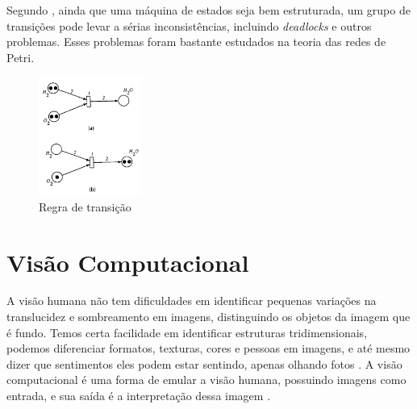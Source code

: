 Segundo , ainda que uma máquina de estados seja bem estruturada, um grupo de transições pode levar a sérias inconsistências, incluindo \textit{deadlocks} e outros problemas. Esses problemas foram bastante estudados na teoria das redes de Petri. 

 \begin{figure}[H]
	\centering
    	\caption{\label{fig:petri}Regra de transição}
		\includegraphics[width = 0.3\textwidth]	{resources/petri}
\end{figure}



\section{Visão Computacional}

A visão humana não tem dificuldades em identificar pequenas variações na translucidez e sombreamento em imagens, distinguindo os objetos da imagem que é fundo. Temos certa facilidade em identificar estruturas tridimensionais, podemos diferenciar formatos, texturas, cores e pessoas em imagens, e até mesmo dizer que sentimentos eles podem estar sentindo, apenas olhando fotos \cite{szeliski2010computer}.
% 
A visão computacional é uma forma de emular a visão humana, possuindo imagens como entrada, e sua saída é a interpretação dessa imagem \cite{marengoni:2009}.

